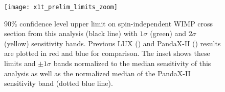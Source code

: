 \begin{figure}
\centering
\texttt{[image: x1t\_prelim\_limits\_zoom]}
\caption{90\% confidence level upper limit on spin-independent WIMP cross section from this analysis (black line) with $1\sigma$ (green)
and $2\sigma$ (yellow) sensitivity bands.  Previous LUX () and PandaX-II () results are plotted in
red and blue for comparison.  The inset shows these limits and $\pm 1\sigma$ bands normalized to the median sensitivity of this
analysis as well as the normalized median of the PandaX-II sensitivity band (dotted blue line).}
\label{fig:dark_matter_results_background_limit}
\end{figure}